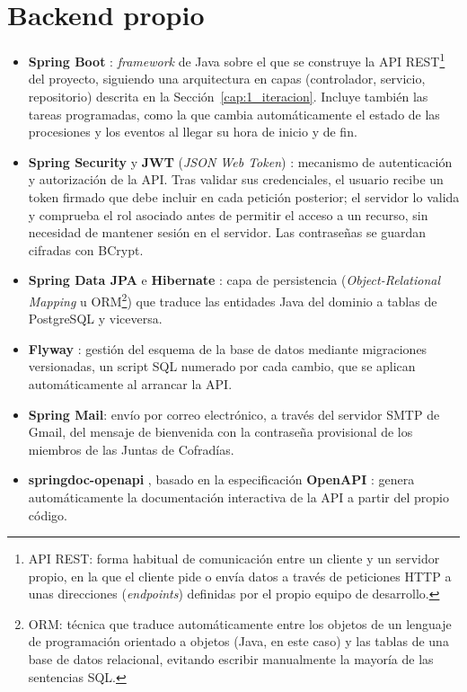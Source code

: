 \section{Backend propio}

\begin{itemize}
    \item \textbf{Spring Boot} \cite{springboot}: \emph{framework} de Java sobre el que se construye la API REST\footnote{API REST: forma habitual de comunicación entre un cliente y un servidor propio, en la que el cliente pide o envía datos a través de peticiones HTTP a unas direcciones (\emph{endpoints}) definidas por el propio equipo de desarrollo.} del proyecto, siguiendo una arquitectura en capas (controlador, servicio, repositorio) descrita en la Sección~\ref{cap:1_iteracion}. Incluye también las tareas programadas, como la que cambia automáticamente el estado de las procesiones y los eventos al llegar su hora de inicio y de fin.
    \item \textbf{Spring Security} \cite{springsecurity} y \textbf{JWT} (\emph{JSON Web Token}) \cite{jwt}: mecanismo de autenticación y autorización de la API. Tras validar sus credenciales, el usuario recibe un token firmado que debe incluir en cada petición posterior; el servidor lo valida y comprueba el rol asociado antes de permitir el acceso a un recurso, sin necesidad de mantener sesión en el servidor. Las contraseñas se guardan cifradas con BCrypt.
    \item \textbf{Spring Data JPA} \cite{springdatajpa} e \textbf{Hibernate} \cite{hibernate}: capa de persistencia (\emph{Object-Relational Mapping} u ORM\footnote{ORM: técnica que traduce automáticamente entre los objetos de un lenguaje de programación orientado a objetos (Java, en este caso) y las tablas de una base de datos relacional, evitando escribir manualmente la mayoría de las sentencias SQL.}) que traduce las entidades Java del dominio a tablas de PostgreSQL y viceversa.
    \item \textbf{Flyway} \cite{flyway}: gestión del esquema de la base de datos mediante migraciones versionadas, un script SQL numerado por cada cambio, que se aplican automáticamente al arrancar la API.
    \item \textbf{Spring Mail}: envío por correo electrónico, a través del servidor SMTP de Gmail, del mensaje de bienvenida con la contraseña provisional de los miembros de las Juntas de Cofradías.
    \item \textbf{springdoc-openapi} \cite{springdoc}, basado en la especificación \textbf{OpenAPI} \cite{openapi}: genera automáticamente la documentación interactiva de la API a partir del propio código.
\end{itemize}

